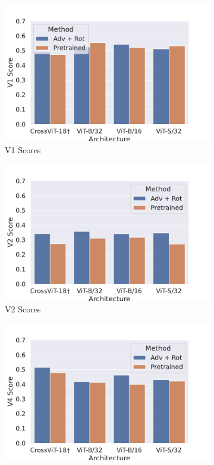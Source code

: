 \documentclass{article} %
\begin{document}
\begin{figure}[!h]
    \centering %
\begin{subfigure}{0.33\textwidth}
  \includegraphics[width=\linewidth]{src/brainscores/brainscore_V1.pdf}
  \caption{V1 Scores}
  \label{fig:1}
\end{subfigure}\hfil %
\begin{subfigure}{0.33\textwidth}
  \includegraphics[width=\linewidth]{src/brainscores/brainscore_V2.pdf}
  \caption{V2 Scores}
  \label{fig:2}
\end{subfigure}\hfil %
\begin{subfigure}{0.33\textwidth}
  \includegraphics[width=\linewidth]{src/brainscores/brainscore_V4.pdf}

\end{subfigure}
\end{figure}
\end{document}
